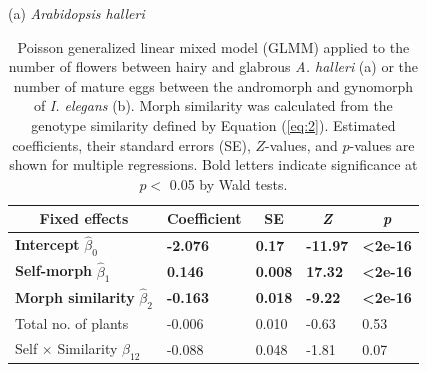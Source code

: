 \documentclass[12pt,]{article}
\begin{document}
\begin{table}[ht]
\caption{Poisson generalized linear mixed model (GLMM) applied to the number of flowers between hairy and glabrous \textit{A. halleri} (a) or the number of mature eggs between the andromorph and gynomorph of \textit{I. elegans} (b). Morph similarity was calculated from the genotype similarity defined by Equation (\ref{eq:2}). Estimated coefficients, their standard errors (SE), $Z$-values, and $p$-values are shown for multiple regressions. Bold letters indicate significance at $p<$ 0.05 by Wald tests.}
(a) \textit{Arabidopsis halleri} \\
\begin{tabular}{lllll}
\hline
\multicolumn{1}{c}{Fixed effects} & \multicolumn{1}{c}{Coefficient} & \multicolumn{1}{c}{SE} & \multicolumn{1}{c}{\textit{Z}} & \multicolumn{1}{c}{\textit{p}} \\ \hline
\textbf{Intercept} $\hat{\beta}_{0}$    & \textbf{-2.076}  &  \textbf{0.17} & \textbf{-11.97} & \textbf{\textless{}2e-16}  \\
\textbf{Self-morph} $\hat{\beta}_{1}$      & \textbf{0.146}                  & \textbf{0.008}         & \textbf{17.32}                 & \textbf{\textless{}2e-16}      \\
\textbf{Morph similarity} $\hat{\beta}_{2}$        & \textbf{-0.163}                 & \textbf{0.018}         & \textbf{-9.22}                 & \textbf{\textless{}2e-16}      \\
Total no. of plants               & -0.006                          & 0.010                  & -0.63                          & 0.53                           \\
Self $\times$ Similarity $\hat{\beta}_{12}$            & -0.088                          & 0.048                  & -1.81                          & 0.07                           \\ \hline
\end{tabular}

\vspace*{5mm}


\end{table}
\end{document}
